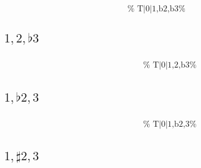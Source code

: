 \documentclass[english]{./gbook}
\begin{document}
\begin{large}
\[\begin{array}{ll}
&
	\text{
	}
\end{array}
\]

\subsection*{$1,2,\flat3$}
\[
\begin{array}{ll}
	\begin{array}{c}
		\begin{array}{ccc}
			&%
			&%
		\end{array}
		\\
		\begin{array}{cc}
			&%
		\end{array}
	\end{array}

&
	\text{
	}
\end{array}
\]

\subsection*{$1,\flat2,3$}
\[
\begin{array}{ll}
	\begin{array}{c}
		\begin{array}{ccc}
			&%
			&%
		\end{array}
		\\
		\begin{array}{cc}
			&%
		\end{array}
	\end{array}

&
	\text{
	}
\end{array}
\]

\subsection*{$1,\sharp2,3$}
\[
\begin{array}{ll}
	\begin{array}{c}
		\begin{array}{ccc}
			&%
			&%
		\end{array}
		\\
		\begin{array}{cc}
			&%
		\end{array}
	\end{array}


\end{array}\]
\end{large}
\end{document}
